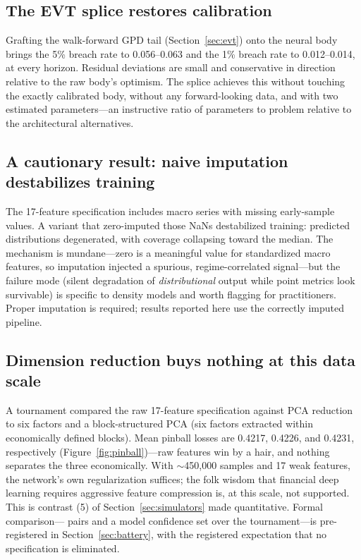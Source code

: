 \documentclass[11pt]{article}
\begin{document}
\subsection{The EVT splice restores calibration}\label{sec:evtresults}
Grafting the walk-forward GPD tail (Section~\ref{sec:evt}) onto the neural body brings the 5\% breach rate to 0.056--0.063 and the 1\% breach rate to 0.012--0.014, at every horizon. Residual deviations are small and conservative in direction relative to the raw body's optimism. The splice achieves this without touching the exactly calibrated body, without any forward-looking data, and with two estimated parameters---an instructive ratio of parameters to problem relative to the architectural alternatives.

\subsection{A cautionary result: naive imputation destabilizes training}\label{sec:nan}
The 17-feature specification includes macro series with missing early-sample values. A variant that zero-imputed those NaNs destabilized training: predicted distributions degenerated, with coverage collapsing toward the median. The mechanism is mundane---zero is a meaningful value for standardized macro features, so imputation injected a spurious, regime-correlated signal---but the failure mode (silent degradation of \emph{distributional} output while point metrics look survivable) is specific to density models and worth flagging for practitioners. Proper imputation is required; results reported here use the correctly imputed pipeline.

\subsection{Dimension reduction buys nothing at this data scale}\label{sec:dimred}
A tournament compared the raw 17-feature specification against PCA reduction to six factors and a block-structured PCA (six factors extracted within economically defined blocks). Mean pinball losses are 0.4217, 0.4226, and 0.4231, respectively (Figure~\ref{fig:pinball})---raw features win by a hair, and nothing separates the three economically. With $\sim$450{,}000 samples and 17 weak features, the network's own regularization suffices; the folk wisdom that financial deep learning requires aggressive feature compression is, at this scale, not supported. This is contrast (5) of Section~\ref{sec:simulators} made quantitative. Formal comparison---\citet{dieboldmariano1995} pairs and a model confidence set \citep{hansen2011mcs} over the tournament---is pre-registered in Section~\ref{sec:battery}, with the registered expectation that no specification is eliminated.
\end{document}
